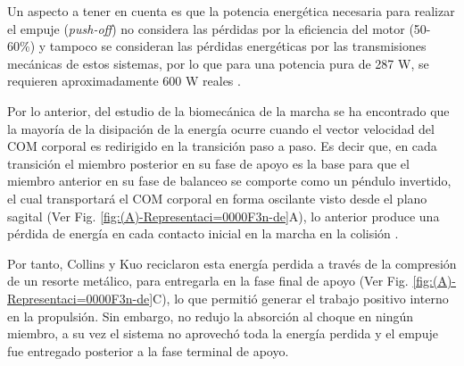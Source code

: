 \documentclass[12pt,english]{article}
\begin{document}
Un aspecto a tener en cuenta es que la potencia energética necesaria
para realizar el empuje (\emph{push-off}) no considera las pérdidas
por la eficiencia del motor (50-60\%) y tampoco se consideran las
pérdidas energéticas por las transmisiones mecánicas de estos sistemas,
por lo que para una potencia pura de 287 W, se requieren aproximadamente
600 W reales \cite{Cherelle2014a}.

Por lo anterior, del estudio de la biomecánica de la marcha se ha
encontrado que la mayoría de la disipación de la energía ocurre cuando
el vector velocidad del COM corporal es redirigido en la transición
paso a paso. Es decir que, en cada transición el miembro posterior
en su fase de apoyo es la base para que el miembro anterior en su
fase de balanceo se comporte como un péndulo invertido, el cual transportará
el COM corporal en forma oscilante visto desde el plano sagital (Ver
Fig. \ref{fig:(A)-Representaci=0000F3n-de}A), lo anterior produce
una pérdida de energía en cada contacto inicial en la marcha en la
colisión \cite{Collins2010}. 

Por tanto, Collins y Kuo \cite{Collins2010} reciclaron esta energía
perdida a través de la compresión de un resorte metálico, para entregarla
en la fase final de apoyo (Ver Fig. \ref{fig:(A)-Representaci=0000F3n-de}C),
lo que permitió generar el trabajo positivo interno en la propulsión.
Sin embargo, no redujo la absorción al choque en ningún miembro, a
su vez el sistema no aprovechó toda la energía perdida y el empuje
fue entregado posterior a la fase terminal de apoyo.
\end{document}
